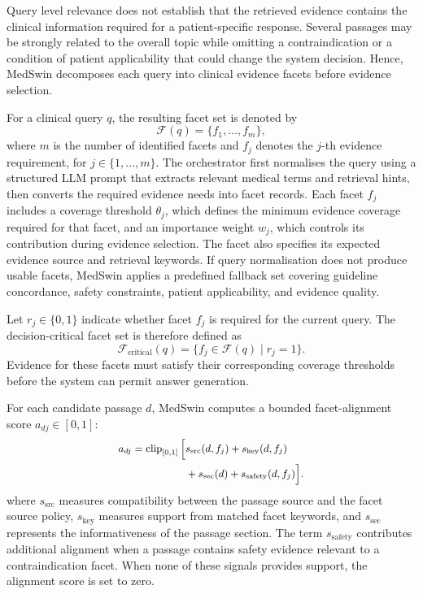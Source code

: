 \documentclass[conference]{IEEEtran}
\begin{document}
Query level relevance does not establish that the retrieved evidence contains the clinical information required for a patient-specific response. Several passages may be strongly related to the overall topic while omitting a contraindication or a condition of patient applicability that could change the system decision. Hence, MedSwin decomposes each query into clinical evidence facets before evidence selection.

For a clinical query \(q\), the resulting facet set is denoted by
\[
\mathcal{F}(q)=\{f_1,\ldots,f_m\},
\]
where \(m\) is the number of identified facets and \(f_j\) denotes the \(j\)-th evidence requirement, for \(j\in\{1,\ldots,m\}\). The orchestrator first normalises the query using a structured LLM prompt that extracts relevant medical terms and retrieval hints, then converts the required evidence needs into facet records. Each facet \(f_j\) includes a coverage threshold \(\theta_j\), which defines the minimum evidence coverage required for that facet, and an importance weight \(w_j\), which controls its contribution during evidence selection. The facet also specifies its expected evidence source and retrieval keywords. If query normalisation does not produce usable facets, MedSwin applies a predefined fallback set covering guideline concordance, safety constraints, patient applicability, and evidence quality.

Let \(r_j\in\{0,1\}\) indicate whether facet \(f_j\) is required for the current query. The decision-critical facet set is therefore defined as
\[
\mathcal{F}_{\mathrm{critical}}(q)
=
\{f_j\in\mathcal{F}(q)\mid r_j=1\}.
\]
Evidence for these facets must satisfy their corresponding coverage thresholds before the system can permit answer generation.

For each candidate passage \(d\), MedSwin computes a bounded facet-alignment score 
\(a_{dj}\in[0,1]\):
\begin{equation}
\label{eq:facet-alignment}
\small
\begin{aligned}
a_{dj}
=
\operatorname{clip}_{[0,1]}
\Big[
&s_{\mathrm{src}}(d,f_j)
+s_{\mathrm{key}}(d,f_j) \\
&+s_{\mathrm{sec}}(d)
+s_{\mathrm{safety}}(d,f_j)
\Big].
\end{aligned}
\end{equation}
where \(s_{\mathrm{src}}\) measures compatibility between the passage source and the facet source policy, \(s_{\mathrm{key}}\) measures support from matched facet keywords, and \(s_{\mathrm{sec}}\) represents the informativeness of the passage section. The term \(s_{\mathrm{safety}}\) contributes additional alignment when a passage contains safety evidence relevant to a contraindication facet. When none of these signals provides support, the alignment score is set to zero.
\end{document}
